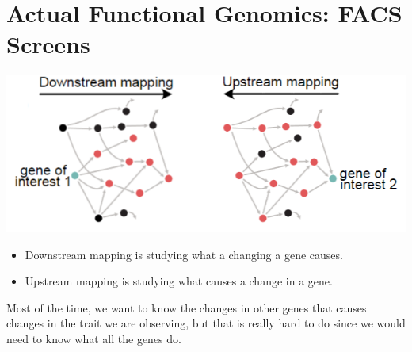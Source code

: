\documentclass[10pt]{article}
\begin{document}
\section*{Actual Functional Genomics: FACS Screens}
\begin{center}
    \includegraphics*[scale=0.8]{W9_1.png}
\end{center}
\begin{itemize}
    \item Downstream mapping is studying what a changing a gene causes.
    \item Upstream mapping is studying what causes a change in a gene.
\end{itemize}
Most of the time, we want to know the changes in other genes that causes changes in the trait we are observing, but that is really hard to do since we would need to know what all the genes do.
\end{document}
